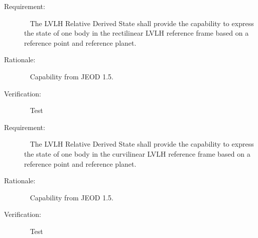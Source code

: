 
%
%
%

\label{reqt:RLVLH}
\begin{description}
  \item[Requirement:]\ \newline
     The LVLH Relative Derived State shall provide the capability to express the
state of one body in the rectilinear LVLH reference frame based on a reference
point and reference planet.
  \item[Rationale:]\ \newline
     Capability from JEOD 1.5.
  \item[Verification:]\ \newline
     Test
\end{description}

\label{reqt:CLVLH}
\begin{description}
  \item[Requirement:]\ \newline
     The LVLH Relative Derived State shall provide the capability to express the
state of one body in the curvilinear LVLH reference frame based on a reference
point and reference planet.
  \item[Rationale:]\ \newline
     Capability from JEOD 1.5.
  \item[Verification:]\ \newline
     Test
\end{description}


